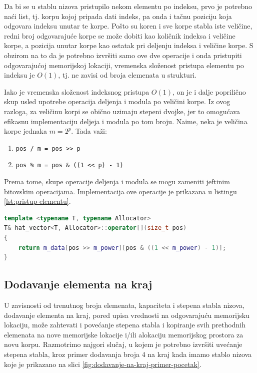 \documentclass[a4paper]{article}
\begin{document}
Da bi se u stablu nizova pristupilo nekom elementu po indeksu, prvo je potrebno naći list, tj. korpu kojoj pripada dati indeks, pa onda i tačnu poziciju koja odgovara indeksu unutar te korpe. Pošto su koren i sve korpe stabla iste veličine, redni broj odgovarajuće korpe se može dobiti kao količnik indeksa i veličine korpe, a pozicija unutar korpe kao ostatak pri deljenju indeksa i veličine korpe. S obzirom na to da je potrebno izvršiti samo ove dve operacije i onda pristupiti odgovarajućoj memorijskoj lokaciji, vremenska složenost pristupa elementu po indeksu je $O(1)$, tj. ne zavisi od broja elemenata u strukturi.

Iako je vremenska složenost indeksnog pristupa $O(1)$, on je i dalje poprilično skup usled upotrebe operacija deljenja i modula po veličini korpe. Iz ovog razloga, za veličinu korpi se obično uzimaju stepeni dvojke, jer to omogućava efikasnu implementaciju deljeja i modula po tom broju. Naime, neka je veličina korpe jednaka $m = 2^p$. Tada važi:
\begin{enumerate}
    \item \verb|pos / m = pos >> p|
    \item \verb|pos % m = pos & ((1 << p) - 1)|
\end{enumerate}
Prema tome, skupe operacije deljenja i modula se mogu zameniti jeftinim bitovskim operacijama. Implementacija ove operacije je prikazana u listingu \ref{lst:pristup-elementu}.

\begin{lstlisting}[language=C++, caption={Operacija pristupa elementu po indeksu \textit{pos}}, captionpos=b, label={lst:pristup-elementu}]
template <typename T, typename Allocator>
T& hat_vector<T, Allocator>::operator[](size_t pos)
{
    return m_data[pos >> m_power][pos & ((1 << m_power) - 1)];
}
\end{lstlisting}

\subsection{Dodavanje elementa na kraj}
\label{subsec:dodavanje-elementa-na-kraj}

U zavisnosti od trenutnog broja elemenata, kapaciteta i stepena stabla nizova, dodavanje elementa na kraj, pored upisa vrednosti na odgovarajuću memorijsku lokaciju, može zahtevati i povećanje stepena stabla i kopiranje svih prethodnih elemenata na nove memorijske lokacije i/ili alokaciju memorijskog prostora za novu korpu. Razmotrimo najgori slučaj, u kojem je potrebno izvršiti uvećanje stepena stabla, kroz primer dodavanja broja 4 na kraj kada imamo stablo nizova koje je prikazano na slici \ref{fig:dodavanje-na-kraj-primer-pocetak}.
\end{document}
